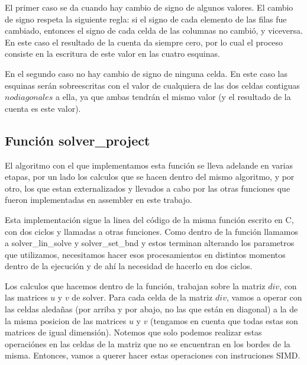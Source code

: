 \par El primer caso se da cuando hay cambio de signo de algunos valores. El cambio de signo respeta la siguiente regla: si el signo de cada elemento de las filas fue cambiado, entonces el signo de cada celda de las columnas no cambió, y viceversa. En este caso el resultado de la cuenta da siempre cero, por lo cual el proceso consiste en la escritura de este valor en las cuatro esquinas.\newline
\par En el segundo caso no hay cambio de signo de ninguna celda. En este caso las esquinas serán sobreescritas con el valor de cualquiera de las dos celdas contiguas \(no diagonales\) a ella, ya que ambas tendrán el mismo valor (y el resultado de la cuenta es este valor).\newline


\subsection{Función solver\_project}
\par El algoritmo con el que implementamos esta función se lleva adelande en varias etapas, por un lado los calculos que se hacen dentro del mismo algoritmo, y por otro, los que estan externalizados y llevados a cabo por las otras funciones que fueron implementadas en assembler en este trabajo.\newline

\par Esta implementación sigue la linea del código de la misma función escrito en C, con dos ciclos y llamadas a otras funciones. Como dentro de la función llamamos a solver\_lin\_solve y solver\_set\_bnd y estos terminan alterando los parametros que utilizamos, necesitamos hacer esos procesamientos en distintos momentos dentro de la ejecución y de ahí la necesidad de hacerlo en dos ciclos.\newline

\par Los calculos que hacemos dentro de la función, trabajan sobre la matriz $div$, con las matrices $u$ y $v$ de solver. Para cada celda de la matriz $div$, vamos a operar con las celdas aledañas (por arriba y por abajo, no las que están en diagonal) a la de la misma posicion de las matrices $u$ y $v$ (tengamos en cuenta que todas estas son matrices de igual dimensión).
Notemos que solo podemos realizar estas operaciónes en las celdas de la matriz que no se encuentran en los bordes de la misma.
Entonces, vamos a querer hacer estas operaciones con instruciones SIMD.

